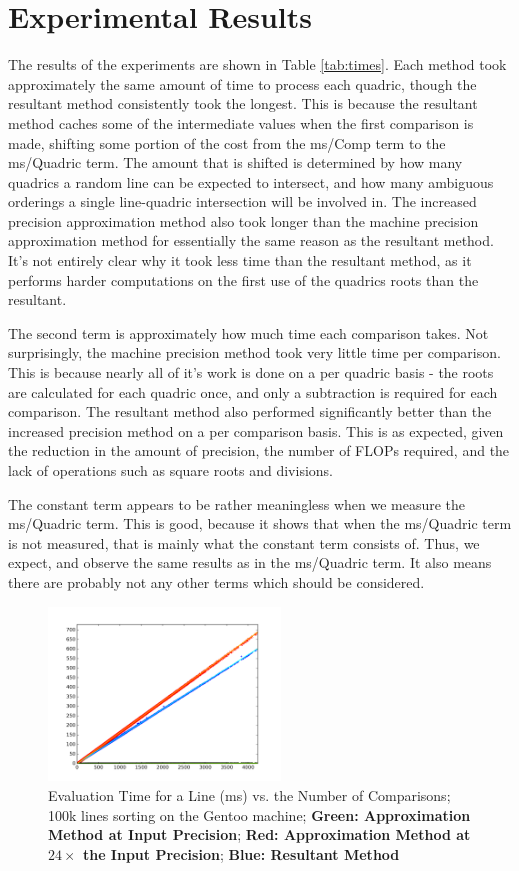 \documentclass{cccg16}
\begin{document}
\section{Experimental Results}
The results of the experiments are shown in Table \ref{tab:times}.
Each method took approximately the same amount of time to process each
quadric, though the resultant method consistently took the longest.
This is because the resultant method caches some of the intermediate
values when the first comparison is made, shifting some portion of the
cost from the ms/Comp term to the ms/Quadric term.  The
amount that is shifted is determined by how many quadrics a random
line can be expected to intersect, and how many ambiguous orderings a
single line-quadric intersection will be involved in.  The increased
precision approximation method also took longer than the machine
precision approximation method for essentially the same reason as the
resultant method.  It's not entirely clear why it took less time than
the resultant method, as it performs harder computations on the first
use of the quadrics roots than the resultant.

The second term is approximately how much time each comparison takes.
Not surprisingly, the machine precision method took very little time
per comparison.  This is because nearly all of it's work is done on a
per quadric basis - the roots are calculated for each quadric once,
and only a subtraction is required for each comparison. The resultant
method also performed significantly better than the increased
precision method on a per comparison basis.  This is as expected,
given the reduction in the amount of precision, the number of FLOPs
required, and the lack of operations such as square roots and
divisions.

The constant term appears to be rather meaningless when we measure the
ms/Quadric term.  This is good, because it shows that when the
ms/Quadric term is not measured, that is mainly what the constant term
consists of.  Thus, we expect, and observe the same results as in the
ms/Quadric term.  It also means there are probably not any other terms
which should be considered.

\begin{figure}
  \includegraphics[width=0.55\textwidth]{imgs/hardEllipsoidsSingle_gentoo_adjusted.png}
  \caption{Evaluation Time for a Line (ms) vs. the Number of
    Comparisons; 100k lines sorting on the Gentoo machine; {\bf Green:
      Approximation Method at Input Precision}; {\bf Red:
      Approximation Method at $24\times$ the Input Precision}; {\bf
      Blue: Resultant Method}}
  \label{fig:linefit}
\end{figure}
\end{document}
